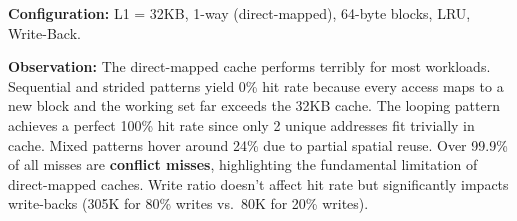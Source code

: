 \documentclass[12pt,a4paper]{article}
\begin{document}
\textbf{Configuration:} L1 = 32KB, 1-way (direct-mapped), 64-byte blocks, LRU, Write-Back.

\begin{table}[H]
\centering
\caption{Task 2 --- Baseline Results (1-way, 64B blocks, LRU, Write-Back)}
\end{table}

\textbf{Observation:} The direct-mapped cache performs terribly for most workloads. Sequential and strided patterns yield 0\% hit rate because every access maps to a new block and the working set far exceeds the 32KB cache. The looping pattern achieves a perfect 100\% hit rate since only 2 unique addresses fit trivially in cache. Mixed patterns hover around 24\% due to partial spatial reuse. Over 99.9\% of all misses are \textbf{conflict misses}, highlighting the fundamental limitation of direct-mapped caches. Write ratio doesn't affect hit rate but significantly impacts write-backs (305K for 80\% writes vs.\ 80K for 20\% writes).
\end{document}
